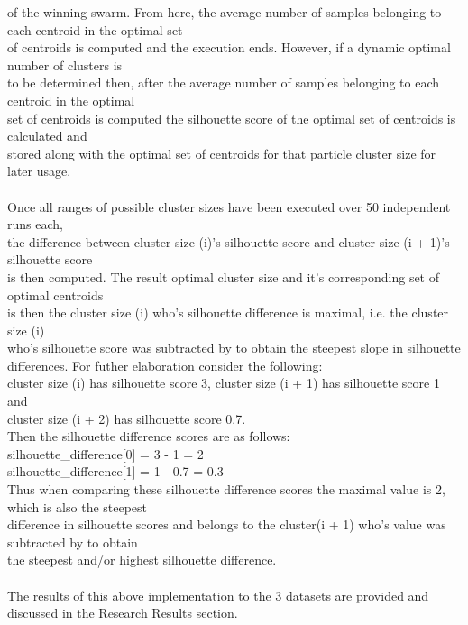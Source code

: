 \begin{flushleft}
        of the winning swarm. From here, the average number of samples belonging to each centroid in the optimal set \\
        of centroids is computed and the execution ends. However, if a dynamic optimal number of clusters is \\
        to be determined then, after the average number of samples belonging to each centroid in the optimal \\
        set of centroids is computed the silhouette score of the optimal set of centroids is calculated and \\
        stored along with the optimal set of centroids for that particle cluster size for later usage.\\ \\

        Once all ranges of possible cluster sizes have been executed over 50 independent runs each, \\
        the difference between cluster size (i)'s silhouette score and cluster size (i + 1)'s silhouette score \\
        is then computed. The result optimal cluster size and it's corresponding set of optimal centroids \\
        is then the cluster size (i)  who's silhouette difference is maximal, i.e. the cluster size (i) \\
        who's silhouette score was subtracted by to obtain the steepest slope in silhouette differences.
        For futher elaboration consider the following:\\
        cluster size (i) has silhouette score 3, cluster size (i + 1) has silhouette score 1 and \\
        cluster size (i + 2) has silhouette score 0.7. \\
        Then the silhouette difference scores are as follows: \\
        silhouette_difference[0] = 3 - 1 = 2 \\
        silhouette_difference[1] = 1 - 0.7 = 0.3 \\
        Thus when comparing these silhouette difference scores the maximal value is 2, which is also the steepest \\
        difference in silhouette scores and belongs to the cluster(i + 1) who's value was subtracted by to obtain \\
        the steepest and/or highest silhouette difference.
        \\ \\
        The results of this above implementation to the 3 datasets are provided and discussed in the Research Results section.
\end{flushleft}